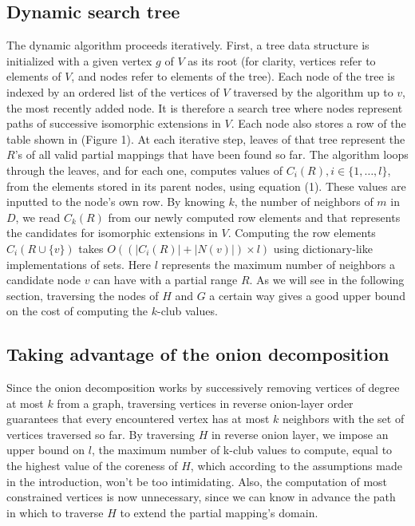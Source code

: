 \documentclass{article}
\begin{document}
\subsection{Dynamic search tree}
The dynamic algorithm proceeds iteratively. First, a tree data structure is initialized with a given vertex $g$ of $V$ as its root (for clarity, vertices refer to elements of $V$, and nodes refer to elements of the tree). Each node of the tree is indexed by an ordered list of the vertices of $V$ traversed by the algorithm up to $v$, the most recently added node. It is therefore a search tree where nodes represent paths of successive isomorphic extensions in $V$. Each node also stores a row of the table shown in (Figure 1). At each iterative step, leaves of that tree represent the $R$'s of all valid partial mappings that have been found so far. The algorithm loops through the leaves, and for each one, computes values of $C_i(R), i \in \{1, \dots, l\}$, from the elements stored in its parent nodes, using equation (1). These values are inputted to the node's own row. By knowing $k$, the number of neighbors of $m$ in $D$, we read $C_k(R)$ from our newly computed row elements and that represents the candidates for isomorphic extensions in $V$. Computing the row elements $C_i(R \cup \{v\})$ takes $O((|C_i(R)| + |N(v)|) \times l)$ using dictionary-like implementations of sets. Here $l$ represents the maximum number of neighbors a candidate node $v$ can have with a partial range $R$. As we will see in the following section, traversing the nodes of $H$ and $G$ a certain way gives a good upper bound on the cost of computing the $k$-club values.

\subsection{Taking advantage of the onion decomposition}
Since the onion decomposition works by successively removing vertices of degree at most $k$ from a graph, traversing vertices in reverse onion-layer order guarantees that every encountered vertex has at most $k$ neighbors with the set of vertices traversed so far. By traversing $H$ in reverse onion layer, we impose an upper bound on $l$, the maximum number of k-club values to compute, equal to the highest value of the coreness of $H$, which according to the assumptions made in the introduction, won't be too intimidating. Also, the computation of most constrained vertices is now unnecessary, since we can know in advance the path in which to traverse $H$ to extend the partial mapping's domain.
\end{document}
